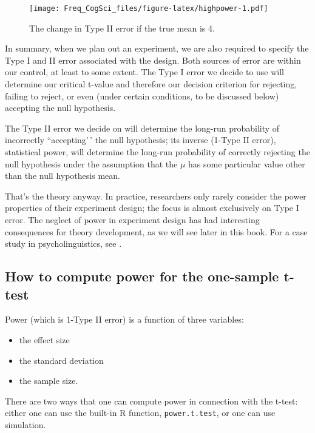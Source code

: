 \documentclass[
  12pt,
]{krantz}
\providecommand{\tightlist}{%
  \setlength{\itemsep}{0pt}\setlength{\parskip}{0pt}}
\theoremstyle{definition}
\theoremstyle{definition}
\theoremstyle{definition}
\theoremstyle{definition}
\theoremstyle{remark}
\begin{document}
\begin{figure}
\centering
\texttt{[image: Freq\_CogSci\_files/figure-latex/highpower-1.pdf]}
\caption{\label{fig:highpower}The change in Type II error if the true mean is 4.}
\end{figure}

In summary, when we plan out an experiment, we are also required to specify the Type I and II error associated with the design. Both sources of error are within our control, at least to some extent. The Type I error we decide to use will determine our critical t-value and therefore our decision criterion for rejecting, failing to reject, or even (under certain conditions, to be discussed below) accepting the null hypothesis.

The Type II error we decide on will determine the long-run probability of incorrectly ``accepting'\,' the null hypothesis; its inverse (1-Type II error), statistical power, will determine the long-run probability of correctly rejecting the null hypothesis under the assumption that the \(\mu\) has some particular value other than the null hypothesis mean.

That's the theory anyway. In practice, researchers only rarely consider the power properties of their experiment design; the focus is almost exclusively on Type I error. The neglect of power in experiment design has had interesting consequences for theory development, as we will see later in this book. For a case study in psycholinguistics, see \citet{VasishthMertzenJaegerGelman2018}.

\hypertarget{how-to-compute-power-for-the-one-sample-t-test}{%
\subsection{How to compute power for the one-sample t-test}\label{how-to-compute-power-for-the-one-sample-t-test}}

Power (which is 1-Type II error) is a function of three variables:

\begin{itemize}
\tightlist
\item
  the effect size
\item
  the standard deviation
\item
  the sample size.
\end{itemize}

There are two ways that one can compute power in connection with the t-test: either one can use the built-in R function, \texttt{power.t.test}, or one can use simulation.
\end{document}
